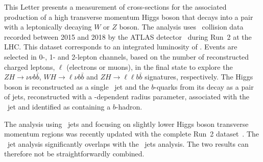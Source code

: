 This Letter presents a measurement of cross-sections for the
associated production of a high transverse momentum Higgs boson that
decays into a \bbbar pair with a leptonically decaying $W$ or $Z$
boson. The analysis uses \pp\ collision data recorded between 2015 and
2018 by the ATLAS detector~\cite{PERF-2007-01} during Run~2 at the
LHC. This dataset corresponds to an integrated luminosity
of \intlumi. Events are selected in 0-, 1- and 2-lepton channels,
based on the number of reconstructed charged leptons, $\ell$
(electrons or muons), in the final state to explore the $ZH \to \nu\nu
b\bar{b}$, $WH \to \ell \nu b \bar{b}$ and $ZH \to \ell\ell b\bar{b}$
signatures, respectively. The Higgs boson is reconstructed as a
single \largeR\ jet and the $b$-quarks from its decay as a pair of
jets, reconstructed with a \pt-dependent radius parameter, associated
with the \largeR\ jet and identified as containing a $b$-hadron.

The analysis using \smallR\ jets and focusing on slightly lower Higgs
boson transverse momentum regions was recently updated with the complete Run~2
dataset~\cite{HIGG-2018-51}.
The \largeR\ jet analysis
significantly overlaps with the \smallR\ jets analysis. The two
results can therefore not be straightforwardly combined.








